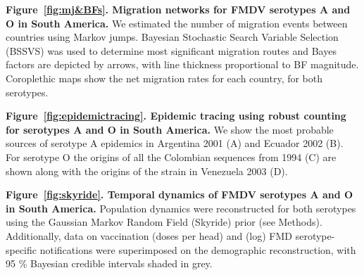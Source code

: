 \documentclass[10pt]{article}
\begin{document}
{\bf Figure~\ref{fig:mj&BFs}. Migration networks for FMDV serotypes A and O in South America.} We estimated the number of migration events between countries using Markov jumps.
Bayesian Stochastic Search Variable Selection (BSSVS) was used to determine most significant migration routes and Bayes factors are depicted by arrows, with line thickness proportional to BF magnitude.
Coroplethic maps show the net migration rates for each country, for both serotypes.

{\bf Figure~\ref{fig:epidemictracing}. Epidemic tracing using robust counting for serotypes A and O in South America.} We show the most probable sources of serotype A epidemics in Argentina 2001 (A) and Ecuador 2002 (B).
For serotype O the origins of  all the Colombian sequences from 1994 (C) are shown along with the origins of the strain in Venezuela 2003 (D).

{\bf Figure~\ref{fig:skyride}. Temporal dynamics of FMDV serotypes A and O in South America.} Population dynamics were reconstructed for both serotypes using the Gaussian Markov Random Field (Skyride) prior (see Methods).
Additionally, data on vaccination  (doses per head) and (log) FMD serotype-specific notifications were superimposed on the demographic reconstruction, with 95 \% Bayesian credible intervals shaded in grey.

\newpage
\end{document}
